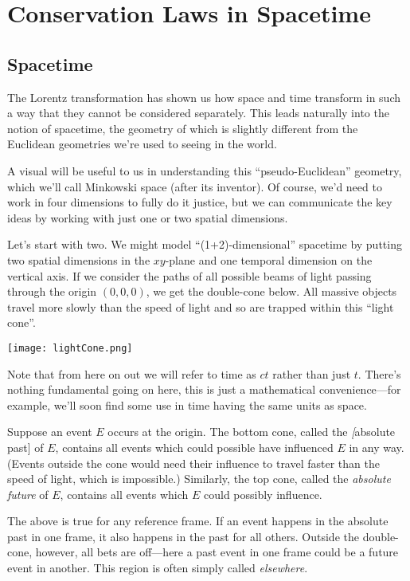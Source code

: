 \documentclass[../p023main.tex]{subfiles}
\begin{document}
\chapter{Conservation Laws in Spacetime}
\section{Spacetime}
The Lorentz transformation has shown us how space and time transform in such a way that they cannot be considered separately.
This leads naturally into the notion of spacetime, the geometry of which is slightly different from the Euclidean geometries we're used to seeing in the world.

A visual will be useful to us in understanding this ``pseudo-Euclidean'' geometry, which we'll call Minkowski space (after its inventor).
Of course, we'd need to work in four dimensions to fully do it justice, but we can communicate the key ideas by working with just one or two spatial dimensions.

Let's start with two.
We might model ``(1+2)-dimensional'' spacetime by putting two spatial dimensions in the $xy$-plane and one temporal dimension on the vertical axis.
If we consider the paths of all possible beams of light passing through the origin $(0,0,0)$, we get the double-cone below.
All massive objects travel more slowly than the speed of light and so are trapped within this ``light cone''.
\begin{center}
    \texttt{[image: lightCone.png]}
\end{center}
Note that from here on out we will refer to time as $ct$ rather than just $t$.
There's nothing fundamental going on here, this is just a mathematical convenience---for example, we'll soon find some use in time having the same units as space.

Suppose an event $E$ occurs at the origin.
The bottom cone, called the \textit[absolute past] of $E$, contains all events which could possible have influenced $E$ in any way.
(Events outside the cone would need their influence to travel faster than the speed of light, which is impossible.)
Similarly, the top cone, called the \textit{absolute future} of $E$, contains all events which $E$ could possibly influence.

The above is true for any reference frame.
If an event happens in the absolute past in one frame, it also happens in the past for all others.
Outside the double-cone, however, all bets are off---here a past event in one frame could be a future event in another.
This region is often simply called \textit{elsewhere}.
\end{document}
